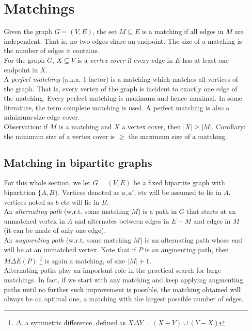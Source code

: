 
\chapter{Matchings}
Given the graph $G = (V, E)$, the set $M \subseteq E$ is a matching if all edges in $M$ are independent. That is, no two edges share an endpoint. The size of a matching is the number of edges it contains.\\

For the graph $G$, $X \subseteq V$ is a \textit{vertex cover} if every edge in $E$ has at least one endpoint in $X$.\\

A \textit{perfect matching} (a.k.a. 1-factor) is a matching which matches all vertices of the graph. That is, every vertex of the graph is incident to exactly one edge of the matching. Every perfect matching is maximum and hence maximal. In some literature, the term complete matching is used. A perfect matching is also a minimum-size edge cover. \\

Observation: if $M$ is a matching and $X$ a vertex cover, then $|X| \geq |M|$. Corollary: the minimum size of a vertex cover is $\geq$ the maximum size of a matching.

\section{Matching in bipartite graphs}
For this whole section, we let $G = (V, E)$ be a fixed bipartite graph with bipartition $\{A, B \}$. Vertices denoted as $a, a'$, etc will be assumed to lie in $A$, vertices noted as $b$ etc will lie in $B$.\\

An \textit{alternating path} (w.r.t. some matching $M$) is a path in $G$ that starts at an unmatched vertex in $A$ and alternates between edges in $E-M$ and edges in $M$ (it can be made of only one edge).\\

An \textit{augmenting path} (w.r.t. some matching $M$) is an alternating path whose end will be at an unmatched vertex. Note that if $P$ is an augmenting path, then $M \Delta E(P)$ \footnote{$\Delta$, a symmetric difference, defined as $X \Delta Y = (X-Y) \cup (Y-X)$} is again a matching, of size $|M| + 1$. \\

Alternating paths play an important role in the practical search for large matchings. In fact, if we start with any matching and keep applying augmenting paths until no further such improvement is possible, the matching obtained will always be an optimal one, a matching with the largest possible number of edges.

